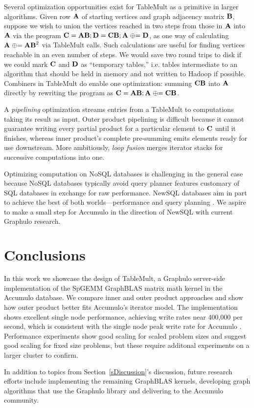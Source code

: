 Several optimization opportunities exist for TableMult as a primitive in larger algorithms.
Given row $\mathbf{A}$ of starting vertices and graph adjacency matrix $\mathbf{B}$, 
suppose we wish to union the vertices reached in two steps from those in $\mathbf{A}$ 
into $\mathbf{A}$ via the program
 $\mathbf{C} = \mathbf{AB}; \mathbf{D} = \mathbf{CB}; \mathbf{A} \mathrel{\oplus}= \mathbf{D}$,
as one way of calculating $\mathbf{A} \mathrel{\oplus}= \mathbf{AB}^2$ via TableMult calls.
Such calculations are useful for finding vertices reachable in an even number of steps.
We would save two round trips to disk if we could mark $\mathbf{C}$ and $\mathbf{D}$ as 
``temporary tables,'' i.e. tables intermediate to an algorithm that should be held in memory 
and not written to Hadoop if possible.
Combiners in TableMult do enable one optimization:
summing $\mathbf{CB}$ into $\mathbf{A}$ directly by rewriting the program as 
$\mathbf{C} = \mathbf{AB}; \mathbf{A} \mathrel{\oplus}= \mathbf{CB}$.

A \emph{pipelining} optimization streams entries from a TableMult 
to computations taking its result as input. 
Outer product pipelining is difficult
because it cannot guarantee writing every partial product for a particular element 
 to $\mathbf{C}$ until it finishes,
whereas inner product's complete pre-summing emits elements ready for use downstream.
More ambitiously, \emph{loop fusion} merges iterator stacks 
for successive computations into one. 

Optimizing computation on NoSQL databases is challenging in the general case because
NoSQL databases typically avoid query planner features 
customary of SQL databases in exchange for raw performance.
NewSQL databases aim in part to achieve the best of both worlds---performance and query planning \cite{grolinger2013data}.
We aspire to make a small step for Accumulo in the direction of NewSQL with current Graphulo research.






\section{Conclusions}
\label{sConclusions}

In this work we showcase the design of TableMult, a Graphulo server-side implementation of the 
SpGEMM GraphBLAS matrix math kernel in the Accumulo database.
We compare inner and outer product approaches and show how outer product 
better fits Accumulo's iterator model.  The implementation shows excellent single node performance, 
achieving write rates near 400,000 per second, 
which is consistent with the single node peak write rate for Accumulo \cite{kepner2014achieving}.
Performance experiments show good scaling for scaled problem sizes and suggest good scaling for fixed size problems,
but these require additonal experiments on a larger cluster to confirm.

In addition to topics from Section~\ref{sDiscussion}'s discussion, 
future research efforts include
implementing the remaining GraphBLAS kernels, 
developing graph algorithms that use the Graphulo library
and delivering to the Accumulo community.
